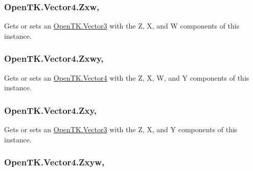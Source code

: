 \hypertarget{struct_open_t_k_1_1_vector4_a1e8fe7f52610bb9ff43d9532334e10ca}{
\subsubsection[{Zxw}]{ Open\-T\-K.\-Vector4.\-Zxw\hspace{0.3cm}{\ttfamily [get]}, {\ttfamily [set]}}}\label{struct_open_t_k_1_1_vector4_a1e8fe7f52610bb9ff43d9532334e10ca}


Gets or sets an \hyperlink{struct_open_t_k_1_1_vector3}{Open\-T\-K.\-Vector3} with the Z, X, and W components of this instance. 

\hypertarget{struct_open_t_k_1_1_vector4_a1321eb94f6330f0ebb95b94a637894da}{
\subsubsection[{Zxwy}]{ Open\-T\-K.\-Vector4.\-Zxwy\hspace{0.3cm}{\ttfamily [get]}, {\ttfamily [set]}}}\label{struct_open_t_k_1_1_vector4_a1321eb94f6330f0ebb95b94a637894da}


Gets or sets an \hyperlink{struct_open_t_k_1_1_vector4}{Open\-T\-K.\-Vector4} with the Z, X, W, and Y components of this instance. 

\hypertarget{struct_open_t_k_1_1_vector4_ad0184a7b31236c5c35d11151f41de82d}{
\subsubsection[{Zxy}]{ Open\-T\-K.\-Vector4.\-Zxy\hspace{0.3cm}{\ttfamily [get]}, {\ttfamily [set]}}}\label{struct_open_t_k_1_1_vector4_ad0184a7b31236c5c35d11151f41de82d}


Gets or sets an \hyperlink{struct_open_t_k_1_1_vector3}{Open\-T\-K.\-Vector3} with the Z, X, and Y components of this instance. 

\hypertarget{struct_open_t_k_1_1_vector4_a80d1e072767fc736ab04ff48bafb3ed5}{
\subsubsection[{Zxyw}]{ Open\-T\-K.\-Vector4.\-Zxyw\hspace{0.3cm}{\ttfamily [get]}, {\ttfamily [set]}}}\label{struct_open_t_k_1_1_vector4_a80d1e072767fc736ab04ff48bafb3ed5}


